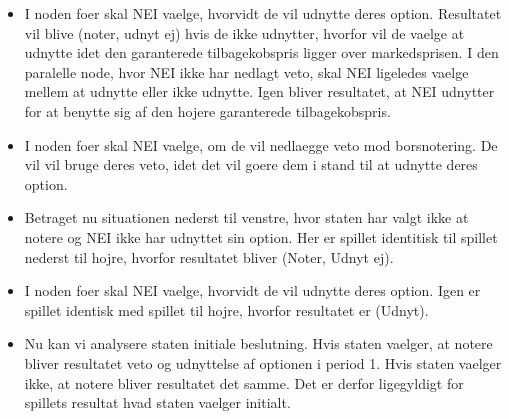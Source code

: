 \documentclass{article}
\begin{document}
\begin{appendices}
\begin{itemize}
		\item I noden foer skal NEI vaelge, hvorvidt de vil udnytte deres option. Resultatet vil blive (noter, udnyt ej) hvis de ikke udnytter, hvorfor vil de vaelge at udnytte idet den garanterede tilbagekobspris ligger over markedsprisen. I den paralelle node, hvor NEI ikke har nedlagt veto, skal NEI ligeledes vaelge mellem at udnytte eller ikke udnytte. Igen bliver resultatet, at NEI udnytter for at benytte sig af den hojere garanterede tilbagekobspris.
		
		\item I noden foer skal NEI vaelge, om de vil nedlaegge veto mod borsnotering. De vil vil bruge deres veto, idet det vil goere dem i stand til at udnytte deres option.
		
			\item Betraget nu situationen nederst til venstre, hvor staten har valgt ikke at notere og NEI ikke har udnyttet sin option. Her er spillet identitisk til spillet nederst til hojre, hvorfor resultatet bliver (Noter, Udnyt ej).
		
			\item I noden foer skal NEI vaelge, hvorvidt de vil udnytte deres option. Igen er spillet identisk med spillet til hojre, hvorfor resultatet er (Udnyt). 
		
			\item Nu kan vi analysere staten initiale beslutning. Hvis staten vaelger, at notere bliver resultatet veto og udnyttelse af optionen i period 1. Hvis staten vaelger ikke, at notere bliver resultatet det samme. Det er derfor ligegyldigt for spillets resultat hvad staten vaelger initialt. 
			
\end{itemize}






\end{appendices}
\end{document}
